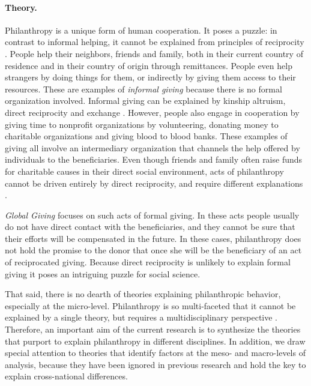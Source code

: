 \documentclass[twocolumn, serif, rga, numeric]{jote-article}
\begin{document}
 {}\paragraph{Theory.} 

Philanthropy is a unique form of human cooperation. It poses a puzzle: in contrast to informal helping, it cannot be explained from principles of reciprocity \cite{Rand2015}. People help their neighbors, friends and family, both in their current country of residence and in their country of origin through remittances. People even help strangers by doing things for them, or indirectly by giving them access to their resources. These are examples of \emph{informal giving} because there is no formal organization involved. Informal giving can be explained by kinship altruism, \cite{Dawkins1976, Hamilton1964} direct reciprocity and exchange \cite{Blau1964, Homans1958}. However, people also engage in cooperation by giving time to nonprofit organizations by volunteering, donating money to charitable organizations and giving blood to blood banks. These examples of giving all involve an intermediary organization that channels the help offered by individuals to the beneficiaries. Even though friends and family often raise funds for charitable causes in their direct social environment, acts of philanthropy cannot be driven entirely by direct reciprocity, and require different explanations \cite{Moody2008, Gouldner1960, Gouldner1973}.

\emph{Global Giving} focuses on such acts of formal giving. In these acts people usually do not have direct contact with the beneficiaries, and they cannot be sure that their efforts will be compensated in the future. In these cases, philanthropy does not hold the promise to the donor that once she will be the beneficiary of an act of reciprocated giving. Because direct reciprocity is unlikely to explain formal giving it poses an intriguing puzzle for social science.

That said, there is no dearth of theories explaining philanthropic behavior, especially at the micro-level. Philanthropy is so multi-faceted that it cannot be explained by a single theory, but requires a multidisciplinary perspective \cite{Brown1997, Dovidio2006}.
Therefore, an important aim of the current research is to synthesize the theories that purport to explain philanthropy in different disciplines.
In addition, we draw special attention to theories that identify factors at the meso- and macro-levels of analysis, because they have been ignored in previous research and hold the key to explain cross-national differences.
\end{document}
